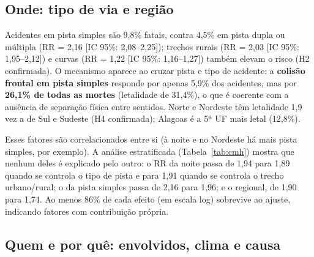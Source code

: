 \subsection{Onde: tipo de via e região}

Acidentes em pista simples são 9,8\% fatais, contra 4,5\% em pista dupla ou múltipla (RR = 2,16 [IC 95\%: 2,08–2,25]); trechos rurais (RR = 2,03 [IC 95\%: 1,95–2,12]) e curvas (RR = 1,22 [IC 95\%: 1,16–1,27]) também elevam o risco (H2 confirmada). O mecanismo aparece ao cruzar pista e tipo de acidente: a \textbf{colisão frontal em pista simples} responde por apenas 5,9\% dos acidentes, mas por \textbf{26,1\% de todas as mortes} (letalidade de 31,4\%), o que é coerente com a ausência de separação física entre sentidos. Norte e Nordeste têm letalidade 1,9 vez a de Sul e Sudeste (H4 confirmada); Alagoas é a 5ª UF mais letal (12,8\%).

Esses fatores são correlacionados entre si (à noite e no Nordeste há mais pista simples, por exemplo). A análise estratificada (Tabela~\ref{tab:cmh}) mostra que nenhum deles é explicado pelo outro: o RR da noite passa de 1,94 para 1,89 quando se controla o tipo de pista e para 1,91 quando se controla o trecho urbano/rural; o da pista simples passa de 2,16 para 1,96; e o regional, de 1,90 para 1,74. Ao menos 86\% de cada efeito (em escala log) sobrevive ao ajuste, indicando fatores com contribuição própria.

\begin{table}[!htbp]
\centering
\small
\caption{Risco relativo bruto e ajustado por estrato (Mantel-Haenszel) e teste CMH.}\label{tab:cmh}
\end{table}

\subsection{Quem e por quê: envolvidos, clima e causa}

